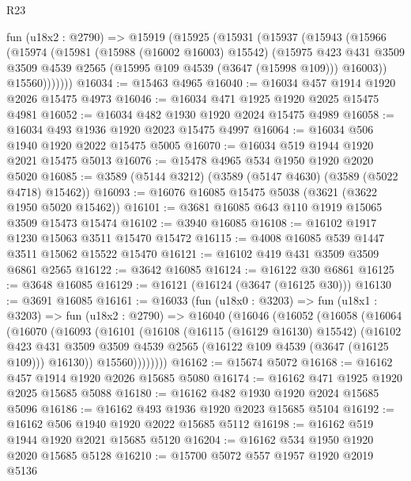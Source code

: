 \begin{lexlean}{R23}
\begin{coremodule}
    fun (u18x2 : @2790) =>
    @15919
      (@15925
        (@15931
          (@15937
            (@15943
              (@15966
                (@15974
                  (@15981
                    (@15988 (@16002 @16003) @15542)
                    (@15975
                      @423
                      @431
                      @3509
                      @3509
                      @4539
                      @2565
                      (@15995 @109 @4539 (@3647 (@15998 @109)))
                      @16003))
                  @15560)))))))
@16034 := @15463 @4965
@16040 := @16034 @457 @1914 @1920 @2026 @15475 @4973
@16046 := @16034 @471 @1925 @1920 @2025 @15475 @4981
@16052 := @16034 @482 @1930 @1920 @2024 @15475 @4989
@16058 := @16034 @493 @1936 @1920 @2023 @15475 @4997
@16064 := @16034 @506 @1940 @1920 @2022 @15475 @5005
@16070 := @16034 @519 @1944 @1920 @2021 @15475 @5013
@16076 := @15478 @4965 @534 @1950 @1920 @2020 @5020
@16085 := @3589 (@5144 @3212) (@3589 (@5147 @4630) (@3589 (@5022 @4718) @15462))
@16093 := @16076 @16085 @15475 @5038 (@3621 (@3622 @1950 @5020 @15462))
@16101 := @3681 @16085 @643 @110 @1919 @15065 @3509 @15473 @15474
@16102 := @3940 @16085
@16108 := @16102 @1917 @1230 @15063 @3511 @15470 @15472
@16115 := @4008 @16085 @539 @1447 @3511 @15062 @15522 @15470
@16121 := @16102 @419 @431 @3509 @3509 @6861 @2565
@16122 := @3642 @16085
@16124 := @16122 @30 @6861
@16125 := @3648 @16085
@16129 := @16121 (@16124 (@3647 (@16125 @30)))
@16130 := @3691 @16085
@16161 := @16033
    (fun (u18x0 : @3203) =>
    fun (u18x1 : @3203) =>
    fun (u18x2 : @2790) =>
    @16040
      (@16046
        (@16052
          (@16058
            (@16064
              (@16070
                (@16093
                  (@16101
                    (@16108
                      (@16115 (@16129 @16130) @15542)
                      (@16102
                        @423
                        @431
                        @3509
                        @3509
                        @4539
                        @2565
                        (@16122 @109 @4539 (@3647 (@16125 @109)))
                        @16130))
                    @15560))))))))
@16162 := @15674 @5072
@16168 := @16162 @457 @1914 @1920 @2026 @15685 @5080
@16174 := @16162 @471 @1925 @1920 @2025 @15685 @5088
@16180 := @16162 @482 @1930 @1920 @2024 @15685 @5096
@16186 := @16162 @493 @1936 @1920 @2023 @15685 @5104
@16192 := @16162 @506 @1940 @1920 @2022 @15685 @5112
@16198 := @16162 @519 @1944 @1920 @2021 @15685 @5120
@16204 := @16162 @534 @1950 @1920 @2020 @15685 @5128
@16210 := @15700 @5072 @557 @1957 @1920 @2019 @5136

\end{coremodule}
\end{lexlean}
